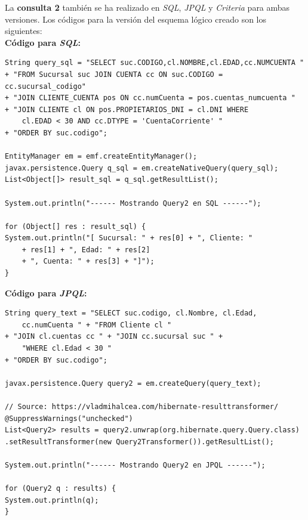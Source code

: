 \documentclass[11pt,a4paper]{article}
\begin{document}
\bigskip

La \textbf{consulta 2} también se ha realizado en \textit{SQL}, \textit{JPQL} y \textit{Criteria} para ambas versiones.
Los códigos para la versión del esquema lógico creado son los siguientes:\\

\textbf{Código para \textit{SQL}:}
\begin{lstlisting}
String query_sql = "SELECT suc.CODIGO,cl.NOMBRE,cl.EDAD,cc.NUMCUENTA "
+ "FROM Sucursal suc JOIN CUENTA cc ON suc.CODIGO = cc.sucursal_codigo"
+ "JOIN CLIENTE_CUENTA pos ON cc.numCuenta = pos.cuentas_numcuenta "
+ "JOIN CLIENTE cl ON pos.PROPIETARIOS_DNI = cl.DNI WHERE 
	cl.EDAD < 30 AND cc.DTYPE = 'CuentaCorriente' "
+ "ORDER BY suc.codigo";

EntityManager em = emf.createEntityManager();
javax.persistence.Query q_sql = em.createNativeQuery(query_sql);
List<Object[]> result_sql = q_sql.getResultList();

System.out.println("------ Mostrando Query2 en SQL ------");

for (Object[] res : result_sql) {
System.out.println("[ Sucursal: " + res[0] + ", Cliente: "
	+ res[1] + ", Edad: " + res[2]
	+ ", Cuenta: " + res[3] + "]");
}
\end{lstlisting}

\textbf{Código para \textit{JPQL}:}
\begin{lstlisting}
String query_text = "SELECT suc.codigo, cl.Nombre, cl.Edad,
	cc.numCuenta " + "FROM Cliente cl "
+ "JOIN cl.cuentas cc " + "JOIN cc.sucursal suc " + 
	"WHERE cl.Edad < 30 "
+ "ORDER BY suc.codigo";

javax.persistence.Query query2 = em.createQuery(query_text);

// Source: https://vladmihalcea.com/hibernate-resulttransformer/
@SuppressWarnings("unchecked")
List<Query2> results = query2.unwrap(org.hibernate.query.Query.class)
.setResultTransformer(new Query2Transformer()).getResultList();

System.out.println("------ Mostrando Query2 en JPQL ------");

for (Query2 q : results) {
System.out.println(q);
}
\end{lstlisting}
\end{document}
